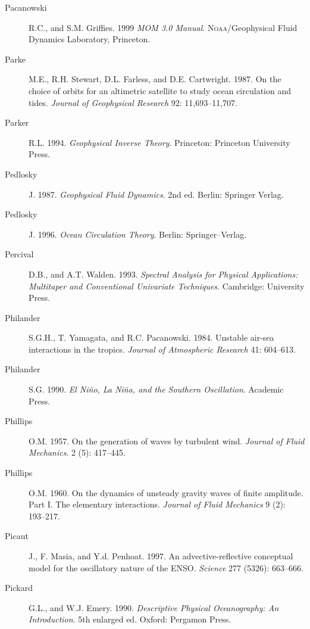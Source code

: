 \begin{description}
\item [Pacanowski]R.C., and S.M. Griffies. 1999 \textit{MOM 3.0
  Manual}.  \textsc{Noaa}/Geophysical Fluid Dynamics Laboratory,
  Princeton.

\item [Parke]M.E., R.H. Stewart, D.L. Farless, and
  D.E. Cartwright. 1987. On the choice of orbits for an altimetric
  satellite to study ocean circulation and tides. \textit{Journal of
    Geophysical Research} 92: 11,693--11,707.

\item [Parker]R.L. 1994. \textit{Geophysical Inverse
  Theory}. Princeton: Princeton University Press.

\item [Pedlosky]J. 1987. \textit{Geophysical Fluid Dynamics}. 2nd ed.
  Berlin: Springer Verlag.

\item [Pedlosky]J. 1996. \textit{Ocean Circulation Theory}.  Berlin:
  Springer--Verlag.

\item [Percival]D.B., and A.T. Walden. 1993. \textit{Spectral Analysis
  for Physical Applications: Multitaper and Conventional Univariate
  Techniques}.  Cambridge: University Press.

\item [Philander]S.G.H., T. Yamagata, and
  R.C. Pacanowski. 1984. Unstable air-sea interactions in the
  tropics. \textit{Journal of Atmospheric Research} 41: 604--613.

\item [Philander]S.G. 1990. \textit{El Ni\~{n}o, La Ni\~{n}a, and the
  Southern Oscillation}. Academic Press.

\item [Phillips]O.M. 1957. On the generation of waves by turbulent
  wind.  \textit{Journal of Fluid Mechanics}. 2 (5): 417--445.

\item [Phillips]O.M. 1960. On the dynamics of unsteady gravity waves
  of finite amplitude.  Part I.  The elementary
  interactions. \textit{Journal of Fluid Mechanics} 9 (2): 193--217.

\item [Picaut]J., F. Masia, and Y.d. Penhoat. 1997. An
  advective-reflective conceptual model for the oscillatory nature of
  the ENSO. \textit{Science} 277 (5326): 663--666.

\item [Pickard]G.L., and W.J. Emery. 1990. \textit{Descriptive
  Physical Oceanography: An Introduction}. 5th enlarged ed. Oxford:
  Pergamon Press.


\end{description}
